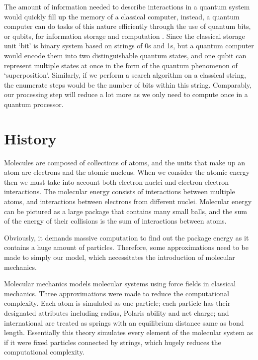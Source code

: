 \documentclass[12pt]{article}
\begin{document}
The amount of information needed to describe interactions in a quantum system would quickly fill up the memory of a classical computer, instead,
a quantum computer can do tasks of this nature efficiently through the use of quantum bits, or qubits, for information storage and computation
\cite{trabesinger2012quantum}. Since the classical storage unit ‘bit’ is binary system based on strings of 0s and 1s, but a quantum computer would
encode them into two distinguishable quantum states, and one qubit can represent multiple states at once in the form of the quantum phenomenon of
‘superposition’. Similarly, if we perform a search algorithm on a classical string, the enumerate steps would be the number of bits within this
string. Comparably, our processing step will reduce a lot more as we only need to compute once in a quantum processor.

\section{History}
Molecules are composed of collections of atoms, and the units that make up an atom are electrons and the atomic nucleus. When we consider the
 atomic energy then we must take into account both electron-nuclei and electron-electron interactions. The molecular energy consists of interactions
 between multiple atoms, and interactions between electrons from different nuclei. Molecular energy can be pictured as a large
 package that contains many small balls, and the sum of the energy of their collisions is the sum of interactions between atoms.

Obviously, it demands massive computation to find out the package energy as it contains a huge amount of particles. Therefore, some approximations
 need to be made to simply our model, which necessitates the introduction of molecular mechanics.

Molecular mechanics models molecular systems using force fields in classical mechanics. Three approximations were made to reduce the computational
 complexity. Each atom is simulated as one particle; each particle has their designated attributes including radius, Polaris ability and net charge;
 and international are treated as springs with an equilibrium distance same as bond length. Essentially this theory simulates every element of the
 molecular system as if it were fixed particles connected by strings, which hugely reduces the computational complexity.
\end{document}
